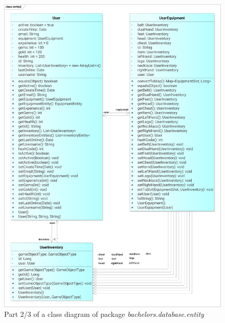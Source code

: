 \begin{figure}[h]	
	\includegraphics[width=\textwidth]{figures/classdiagrams/dsentity2}
	\centering			
	\caption{Part 2/3 of a class diagram of package \textit{bachelors.database.entity}}
\end{figure}

